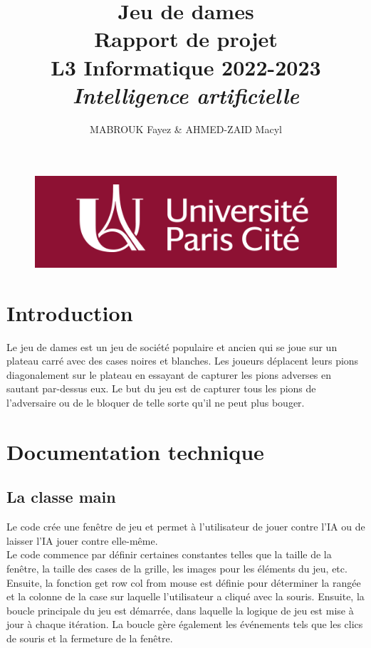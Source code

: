 \documentclass[12pt]{article}
\author{MABROUK Fayez \& AHMED-ZAID Macyl}
\title{{\bf Jeu de dames} \\
	Rapport de projet \\
	{\small L3 Informatique 2022-2023} \\
	{\it \small  Intelligence artificielle}}
\begin{document}
	
	
	\maketitle
		\begin{figure}[!hbtp]
		\centering
		\includegraphics[scale=0.5]{ACTU-UPC.png}
		
	\end{figure}
	
	\newpage
	\tableofcontents
	\newpage
	\section{Introduction}
	Le jeu de dames est un jeu de société populaire et ancien qui se joue sur un plateau carré avec des cases noires et blanches. Les joueurs déplacent leurs pions diagonalement sur le plateau en essayant de capturer les pions adverses en sautant par-dessus eux. Le but du jeu est de capturer tous les pions de l'adversaire ou de le bloquer de telle sorte qu'il ne peut plus bouger. 
	\section{Documentation technique}
	\subsection{La classe main}
	Le code crée une fenêtre de jeu et permet à l'utilisateur de jouer contre l'IA ou de laisser l'IA jouer contre elle-même.\\
	Le code commence par définir certaines constantes telles que la taille de la fenêtre, la taille des cases de la grille, les images pour les éléments du jeu, etc. Ensuite, la fonction get row col from mouse  est définie pour déterminer la rangée et la colonne de la case sur laquelle l'utilisateur a cliqué avec la souris. Ensuite, la boucle principale du jeu est démarrée, dans laquelle la logique de jeu est mise à jour à chaque itération. La boucle gère également les événements tels que les clics de souris et la fermeture de la fenêtre.
\end{document}
